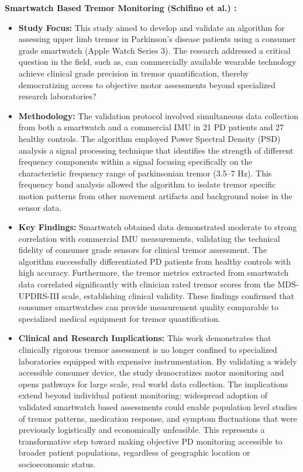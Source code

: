 \documentclass[sigconf,nonacm]{acmart}
\begin{document}
    \textbf{Smartwatch Based Tremor Monitoring (Schifino et al.) \cite{Schifino2025SmartwatchTremorPD}:}
    \begin{itemize}
        \item \textbf{Study Focus:} This study aimed to develop and validate an algorithm for assessing upper limb tremor in Parkinson's disease patients using a consumer grade smartwatch (Apple Watch Series 3). The research addressed a critical question in the field, such as, can commercially available wearable technology achieve clinical grade precision in tremor quantification, thereby democratizing access to objective motor assessments beyond specialized research laboratories?
        
        \item \textbf{Methodology:} The validation protocol involved simultaneous data collection from both a smartwatch and a commercial IMU in 21 PD patients and 27 healthy controls. The algorithm employed Power Spectral Density (PSD) analysis a signal processing technique that identifies the strength of different frequency components within a signal focusing specifically on the characteristic frequency range of parkinsonian tremor (3.5–7 Hz). This frequency band analysis allowed the algorithm to isolate tremor specific motion patterns from other movement artifacts and background noise in the sensor data.
        
        \item \textbf{Key Findings:} Smartwatch obtained data demonstrated moderate to strong correlation with commercial IMU measurements, validating the technical fidelity of consumer grade sensors for clinical tremor assessment. The algorithm successfully differentiated PD patients from healthy controls with high accuracy. Furthermore, the tremor metrics extracted from smartwatch data correlated significantly with clinician rated tremor scores from the MDS-UPDRS-III scale, establishing clinical validity. These findings confirmed that consumer smartwatches can provide measurement quality comparable to specialized medical equipment for tremor quantification.
        
        \item \textbf{Clinical and Research Implications:} This work demonstrates that clinically rigorous tremor assessment is no longer confined to specialized laboratories equipped with expensive instrumentation. By validating a widely accessible consumer device, the study democratizes motor monitoring and opens pathways for large scale, real world data collection. The implications extend beyond individual patient monitoring: widespread adoption of validated smartwatch based assessments could enable population level studies of tremor patterns, medication response, and symptom fluctuations that were previously logistically and economically unfeasible. This represents a transformative step toward making objective PD monitoring accessible to broader patient populations, regardless of geographic location or socioeconomic status.
    \end{itemize}
\end{document}
